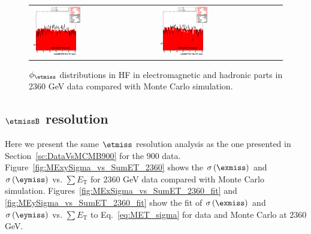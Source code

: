 \begin{figure}[h!]
 \centering
 \begin{tabular}{ll}
  \includegraphics[width=0.40\textwidth]{plots_DataVsMC_MB_2360GeV/my_calometEmHFPhi.eps} &
  \includegraphics[width=0.40\textwidth]{plots_DataVsMC_MB_2360GeV/my_calometHadHFPhi.eps} \\
 \end{tabular}
 \caption{$\phi_{\etmiss}$ distributions in HF in electromagnetic and hadronic parts in 2360 GeV data compared
   with Monte Carlo simulation.
          \label{fig:DataVsMC_MB_2360_10}}
\end{figure}

\clearpage

\subsection[$\etmiss$ resolution]{$\etmissB$ resolution}

Here we present the same $\etmiss$ resolution analysis as the one presented in Section~\ref{sc:DataVsMCMB900} for the $900$ data. 
Figure~\ref{fig:MExySigma_vs_SumET_2360} shows the $\sigma\left(\exmiss\right)$ and $\sigma\left(\eymiss\right)$ 
vs. $\sum E_\text{T}$ for 2360 GeV data compared with Monte Carlo simulation. Figures~\ref{fig:MExSigma_vs_SumET_2360_fit} 
and \ref{fig:MEySigma_vs_SumET_2360_fit} show the fit of $\sigma\left(\exmiss\right)$ and $\sigma\left(\eymiss\right)$ vs. 
$\sum E_\text{T}$ to Eq.~\ref{eq:MET_sigma} for data and  Monte Carlo at $2360$ GeV.

